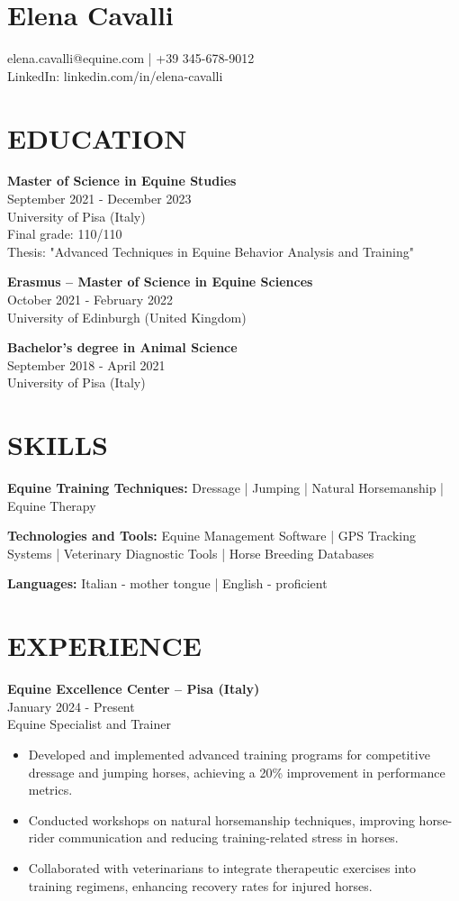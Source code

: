 \documentclass{article}
\begin{document}
\section*{Elena Cavalli}
elena.cavalli@equine.com | +39 345-678-9012 \\
LinkedIn: linkedin.com/in/elena-cavalli

\section*{EDUCATION}

\textbf{Master of Science in Equine Studies} \\
September 2021 - December 2023 \\
University of Pisa (Italy) \\
Final grade: 110/110 \\
Thesis: "Advanced Techniques in Equine Behavior Analysis and Training"

\textbf{Erasmus – Master of Science in Equine Sciences} \\
October 2021 - February 2022 \\
University of Edinburgh (United Kingdom)

\textbf{Bachelor’s degree in Animal Science} \\
September 2018 - April 2021 \\
University of Pisa (Italy)

\section*{SKILLS}

\textbf{Equine Training Techniques:} Dressage | Jumping | Natural Horsemanship | Equine Therapy

\textbf{Technologies and Tools:} Equine Management Software | GPS Tracking Systems | Veterinary Diagnostic Tools | Horse Breeding Databases

\textbf{Languages:} Italian - mother tongue | English - proficient

\section*{EXPERIENCE}

\textbf{Equine Excellence Center – Pisa (Italy)} \\
January 2024 - Present \\
Equine Specialist and Trainer \\
\begin{itemize}[leftmargin=*]
    \item Developed and implemented advanced training programs for competitive dressage and jumping horses, achieving a 20\% improvement in performance metrics.
    \item Conducted workshops on natural horsemanship techniques, improving horse-rider communication and reducing training-related stress in horses.
    \item Collaborated with veterinarians to integrate therapeutic exercises into training regimens, enhancing recovery rates for injured horses.
\end{itemize}
\end{document}

